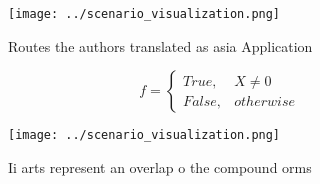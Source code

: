 \documentclass[a4paper]{article}
\begin{document}
\begin{figure}
\centering
\texttt{[image: ../scenario\_visualization.png]}
\caption{Routes the authors translated as asia Application
}
\end{figure}
 
\begin{equation}   f =
\begin{cases} True, & X \neq 0\\
False, & otherwise
\end{cases}
\end{equation}

\begin{figure}
\centering
\texttt{[image: ../scenario\_visualization.png]}
\caption{Ii arts represent an overlap o the compound orms 
}
\end{figure}
 
\end{document}
